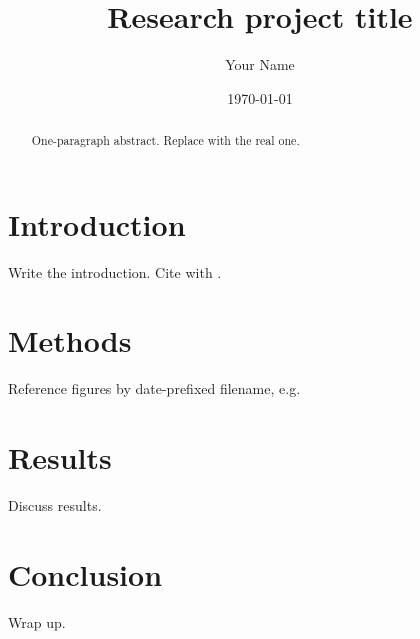 \documentclass[11pt]{article}
\title{Research project title}
\author{Your Name}
\date{\today}
\begin{document}
\maketitle

\begin{abstract}
One-paragraph abstract. Replace with the real one.
\end{abstract}

\section{Introduction}
Write the introduction. Cite with \citep{example}.

\section{Methods}
Reference figures by date-prefixed filename, e.g.

\section{Results}
Discuss results.

\section{Conclusion}
Wrap up.



\end{document}
